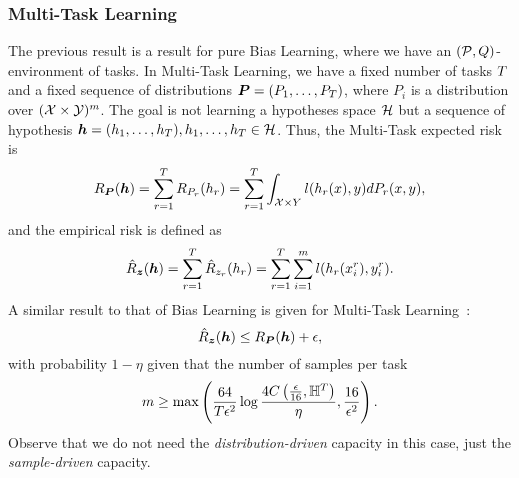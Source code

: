 \subsubsection*{Multi-Task Learning}
The previous result is a result for pure Bias Learning, where we have an $(\mathcal{P}, Q)$-environment of tasks. In Multi-Task Learning, we have a fixed number of tasks $T$ and a fixed sequence of distributions $\bm{P} = (P_1, \ldots, P_T)$, where $P_i$ is a distribution over $(\mathcal{X} \times \mathcal{Y})^m$. The goal is not learning a hypotheses space $\mathcal{H}$ but a sequence of hypothesis $\bm{h} = (h_1, \ldots, h_T), h_1, \ldots, h_T \in \mathcal{H} $. Thus, the Multi-Task expected risk is
\begin{equation}\label{eq:mtlearn_exprisk}
    \risk_{\bprobseq}(\myvec{\hypf}) = \sum_{r=1}^\ntasks \risk_{P_r}(\hypf_r)  = \sum_{r=1}^\ntasks \int_{\Xspace \times Y} l(\hypf_r(x), y) d{P_r}(x, y),
\end{equation}
and the empirical risk is defined as
\begin{equation}\label{eq:mtlearn_emprisk}
    \bemprisk(\myvec{\hypf}) = \sum_{r=1}^\ntasks \hat{\risk}_{\sample_r}(\hypf_r) = \sum_{r=1}^\ntasks \sum_{i=1}^m l(\hypf_r(x_i^r), y_i^r).
\end{equation}
A similar result to that of Bias Learning is given for Multi-Task Learning~\cite[Theorem~4]{baxter2000model}:
\begin{equation}
    \nonumber
    \hat{R}_{\bm{z}}(\bm{h}) \leq R_{\bm{P}}(\bm{h}) + \epsilon,
\end{equation}
with probability $1 - \eta$ given that the number of samples per task
\begin{equation}
    \nonumber
    m \geq \max \left( \frac{64}{T \epsilon^2} \log\frac{4C\left(\frac{\epsilon}{16}, \mathbb{H}^{T}\right)}{\eta} , \frac{16}{\epsilon^2}\right).
\end{equation}
Observe that we do not need the \emph{distribution-driven} capacity in this case, just the \emph{sample-driven} capacity.
